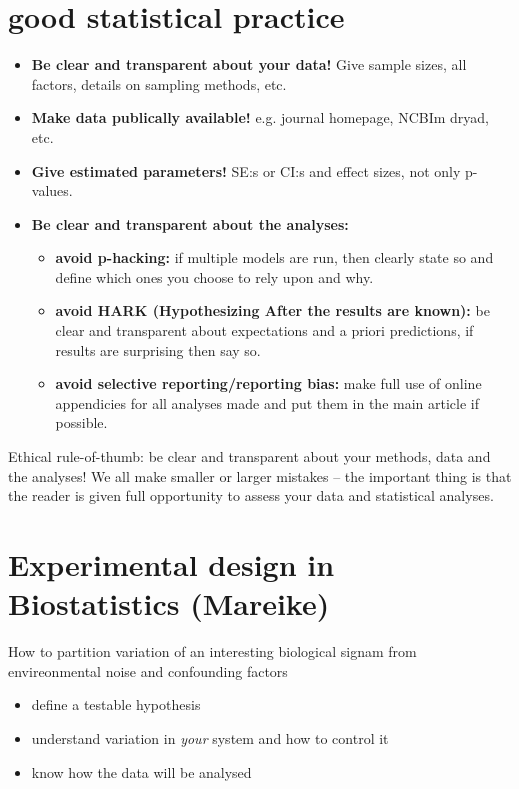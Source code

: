 \documentclass{article}
\begin{document}
\section{good statistical practice}
\begin{itemize}
    \item \textbf{Be clear and transparent about your data!} Give sample sizes, all factors, details on sampling methods, etc.
    \item \textbf{Make data publically available!} e.g. journal homepage, NCBIm dryad, etc.
    \item \textbf{Give estimated parameters!} SE:s or CI:s and effect sizes, not only p-values.
    \item \textbf{Be clear and transparent about the analyses:}
    \begin{itemize}
        \item \textbf{avoid p-hacking:} if multiple models are run, then clearly state so and define which ones you choose to rely upon and why.
        \item \textbf{avoid HARK (Hypothesizing After the results are known):} be clear and transparent about expectations and a priori predictions, if results are surprising then say so.
        \item \textbf{avoid selective reporting/reporting bias:} make full use of online appendicies for all analyses made and put them in the main article if possible.
    \end{itemize}
\end{itemize}
Ethical rule-of-thumb: be clear and transparent about your methods, data and the analyses! We all make smaller or larger mistakes – the important thing is that the reader is given full opportunity to assess your data and statistical analyses.

\section{Experimental design in Biostatistics (Mareike)}

How to partition variation of an interesting biological signam from envireonmental noise and confounding factors

\begin{itemize}
\item define a testable hypothesis
\item understand variation in \textit{your} system and how to control it
\item know how the data will be analysed
\end{itemize}
\end{document}
